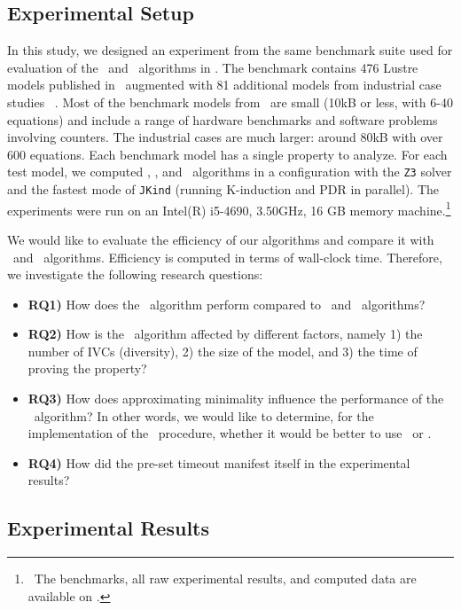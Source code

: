 
\newcommand{\takeaway}[1]{
\vspace{6pt}
\noindent\fbox{\parbox{\textwidth}{#1}}
\vspace{6pt}
}
\subsection{Experimental Setup}
 In this study, we designed an experiment from
 the same benchmark suite used for evaluation of the \ucalg ~and \ucbfalg ~algorithms in \cite{Ghass16}.
 The benchmark contains 476 Lustre models
 published in~\cite{Hagen08:FMCAD} augmented
with 81 additional models from industrial case studies ~\cite{QFCS15:backes,hilt2013}.
 Most of
the benchmark models from~\cite{Hagen08:FMCAD} are small (10kB or less,
with 6-40 equations) and include a range of hardware benchmarks and
software problems involving counters.
The industrial cases are much
larger: around 80kB with over 600 equations.
Each benchmark model has a single property to analyze.
For each test model, we computed \aivcalg , \ucalg , and \ucbfalg ~algorithms
in a configuration with
the \texttt{Z3} solver and the fastest mode of \texttt{JKind} (running K-induction and PDR in parallel). The experiments
were run on an  Intel(R) i5-4690, 3.50GHz,
16 GB memory machine.\footnote{\noindent ~The benchmarks, all raw experimental results,
  and computed data are available on \cite{expr}.}

We would like to evaluate the efficiency
 of our algorithms and compare it with \ucalg ~and \ucbfalg ~algorithms.
 Efficiency is computed in terms of wall-clock time. Therefore, we investigate the following research questions:
\begin{itemize}
  \item \textbf{RQ1)} How does the \aivcalg ~algorithm perform compared to \ucalg ~and \ucbfalg ~algorithms?
  \item \textbf{RQ2)} How is the \aivcalg ~algorithm affected by different factors, namely 1) the number of IVCs (diversity), 2) the size of the model, and 3) the time of proving the property?

  \item \textbf{RQ3)} How does approximating minimality influence the performance of the \aivcalg ~algorithm?
  In other words, we would like to determine, for the implementation of the \getivc ~procedure, whether it would be better to use \ucalg ~or \ucbfalg .
  \item \textbf{RQ4)} How did the pre-set timeout manifest itself in the experimental results?
\end{itemize}


\subsection{Experimental Results}

 